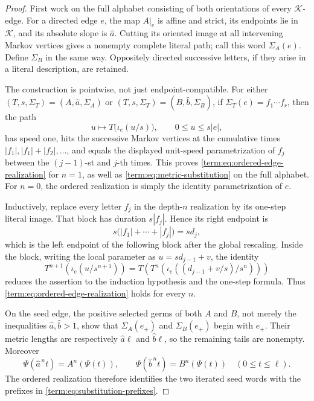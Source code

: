 \documentclass[11pt]{article}
\theoremstyle{definition}
\theoremstyle{remark}
\begin{document}
\begin{proof}
First work on the full alphabet consisting of both orientations of every
\(\mathcal K\)-edge.  For a directed edge \(e\), the map \(A|_e\) is affine
and strict, its endpoints lie in \(\mathcal K\), and its absolute slope is
\(\widehat a\).  Cutting its oriented image at all intervening Markov
vertices gives a nonempty complete literal path; call this word
\(\Sigma_A(e)\).  Define \(\Sigma_B\) in the same way.  Oppositely directed
successive letters, if they arise in a literal description, are retained.

The construction is pointwise, not just endpoint-compatible.  For either
\((T,s,\Sigma_T)=(A,\widehat a,\Sigma_A)\) or
\((T,s,\Sigma_T)=(B,\widehat b,\Sigma_B)\), if
\(\Sigma_T(e)=f_1\cdots f_r\), then the path
\[
 u\longmapsto T\bigl(\iota_e(u/s)\bigr),
 \qquad 0\leq u\leq s|e|,
\]
has speed one, hits the successive Markov vertices at the cumulative times
\(|f_1|,|f_1|+|f_2|,\ldots\), and equals the displayed unit-speed
parametrization of \(f_j\) between the \((j-1)\)-st and \(j\)-th times.
This proves \eqref{term:eq:ordered-edge-realization} for \(n=1\), as well as
\eqref{term:eq:metric-substitution} on the full alphabet.
For \(n=0\), the ordered realization is simply the identity parametrization
of \(e\).

Inductively, replace every letter \(f_j\) in the depth-\(n\) realization by
its one-step literal image.  That block has duration \(s|f_j|\).  Hence its
right endpoint is
\[
 s\bigl(|f_1|+\cdots+|f_j|\bigr)=s d_j,
\]
which is the left endpoint of the following block after the global
rescaling.  Inside the block, writing the local parameter as
\(u=s d_{j-1}+v\), the identity
\[
 T^{n+1}\!\left(\iota_e(u/s^{n+1})\right)
 =T\!\left(T^n\!\left(
   \iota_e((d_{j-1}+v/s)/s^n)\right)\right)
\]
reduces the assertion to the induction hypothesis and the one-step formula.
Thus \eqref{term:eq:ordered-edge-realization} holds for every \(n\).

On the seed edge, the positive selected germs of both \(A\) and \(B\), not
merely the inequalities \(\widehat a,\widehat b>1\), show that
\(\Sigma_A(e_+)\) and \(\Sigma_B(e_+)\) begin with \(e_+\).  Their metric
lengths are respectively \(\widehat a\ell\) and \(\widehat b\ell\), so the
remaining tails are nonempty.  Moreover
\[
 \Psi(\widehat a^{\,n}t)=A^n(\Psi(t)),\qquad
 \Psi(\widehat b^{\,n}t)=B^n(\Psi(t))
 \quad(0\leq t\leq\ell).
\]
The ordered realization therefore identifies the two iterated seed words
with the prefixes in \eqref{term:eq:substitution-prefixes}.


\end{proof}
\end{document}
